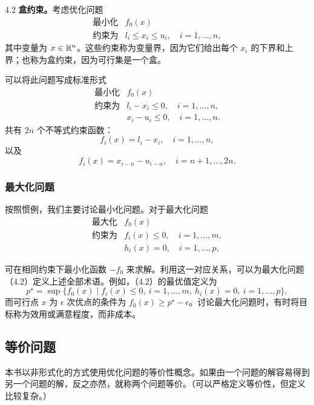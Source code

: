 \begin{origexample}{4.2}
\textbf{盒约束。}考虑优化问题
\[
\begin{array}{ll}
\text{最小化}&f_0(x)\\
\text{约束为}&l_i\le x_i\le u_i,\quad i=1,\ldots,n,
\end{array}
\]
其中变量为 $x\in\mathbb R^n$。这些约束称为变量界，因为它们给出每个 $x_i$ 的下界和上界；也称为盒约束，因为可行集是一个盒。

可以将此问题写成标准形式
\[
\begin{array}{ll}
\text{最小化}&f_0(x)\\
\text{约束为}&l_i-x_i\le0,\quad i=1,\ldots,n,\\
&x_i-u_i\le0,\quad i=1,\ldots,n.
\end{array}
\]
共有 $2n$ 个不等式约束函数：
\[
f_i(x)=l_i-x_i,\quad i=1,\ldots,n,
\]
以及
\[
f_i(x)=x_{i-n}-u_{i-n},\quad i=n+1,\ldots,2n.
\]
\end{origexample}

\subsubsection*{最大化问题}
按照惯例，我们主要讨论最小化问题。对于最大化问题
\begin{equation}
\begin{array}{ll}
\text{最大化}&f_0(x)\\
\text{约束为}&f_i(x)\le0,\quad i=1,\ldots,m,\\
&h_i(x)=0,\quad i=1,\ldots,p,
\end{array}\tag{4.2}
\end{equation}

可在相同约束下最小化函数 $-f_0$ 来求解。利用这一对应关系，可以为最大化问题（4.2）定义上述全部术语。例如，（4.2）的最优值定义为
\[
p^\star=\sup\{f_0(x)\mid f_i(x)\le0,\ i=1,\ldots,m,\ h_i(x)=0,\ i=1,\ldots,p\},
\]
而可行点 $x$ 为 $\epsilon$ 次优点的条件为 $f_0(x)\ge p^\star-\epsilon$。讨论最大化问题时，有时将目标称为效用或满意程度，而非成本。

\subsection{等价问题}
本书以非形式化的方式使用优化问题的等价性概念。如果由一个问题的解容易得到另一个问题的解，反之亦然，就称两个问题等价。（可以严格定义等价性，但定义比较复杂。）

